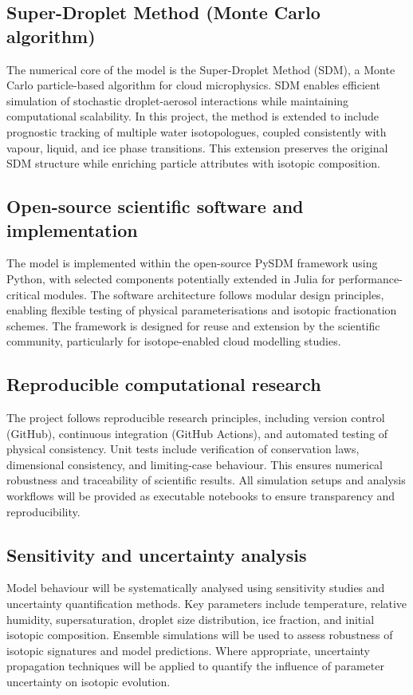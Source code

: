 \documentclass[12pt]{article}
\begin{document}
\subsection*{Super-Droplet Method (Monte Carlo algorithm)}
The numerical core of the model is the Super-Droplet Method (SDM), a Monte Carlo particle-based
algorithm for cloud microphysics.
SDM enables efficient simulation of stochastic droplet-aerosol interactions while maintaining
computational scalability.
In this project, the method is extended to include prognostic tracking of multiple water isotopologues,
coupled consistently with vapour, liquid, and ice phase transitions.
This extension preserves the original SDM structure while enriching particle attributes with isotopic composition.

\subsection*{Open-source scientific software and implementation}
The model is implemented within the open-source PySDM framework using Python,
with selected components potentially extended in Julia for performance-critical modules.
The software architecture follows modular design principles, enabling flexible testing
of physical parameterisations and isotopic fractionation schemes.
The framework is designed for reuse and extension by the scientific community, particularly
for isotope-enabled cloud modelling studies.

\subsection*{Reproducible computational research}
The project follows reproducible research principles, including version control (GitHub),
continuous integration (GitHub Actions), and automated testing of physical consistency.
Unit tests include verification of conservation laws, dimensional consistency, and limiting-case behaviour.
This ensures numerical robustness and traceability of scientific results.
All simulation setups and analysis workflows will be provided as executable notebooks
to ensure transparency and reproducibility.

\subsection*{Sensitivity and uncertainty analysis}

Model behaviour will be systematically analysed using sensitivity studies and uncertainty quantification methods.
Key parameters include temperature, relative humidity, supersaturation, droplet size distribution,
ice fraction, and initial isotopic composition. 
Ensemble simulations will be used to assess robustness of isotopic signatures and model predictions. 
Where appropriate, uncertainty propagation techniques will be applied to quantify
the influence of parameter uncertainty on isotopic evolution.
\end{document}
